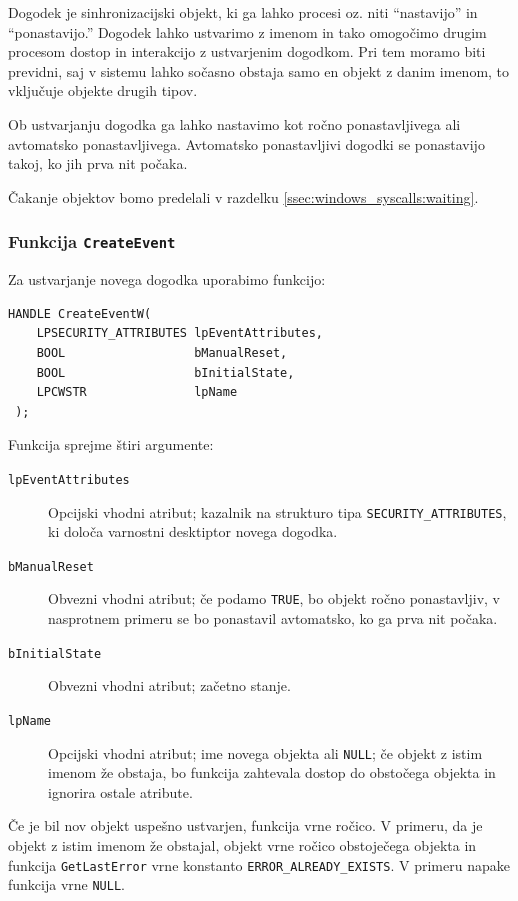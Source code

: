 \documentclass[a4paper,12pt,openright]{book}
\begin{document}
Dogodek je sinhronizacijski objekt, ki ga lahko procesi oz. niti ``nastavijo'' in ``ponastavijo.''
Dogodek lahko ustvarimo z imenom in tako omogočimo drugim procesom dostop in interakcijo z ustvarjenim dogodkom.
Pri tem moramo biti previdni, saj v sistemu lahko sočasno obstaja samo en objekt z danim imenom, to vključuje objekte drugih tipov.

Ob ustvarjanju dogodka ga lahko nastavimo kot ročno ponastavljivega ali avtomatsko ponastavljivega.
Avtomatsko ponastavljivi dogodki se ponastavijo takoj, ko jih prva nit počaka.

Čakanje objektov bomo predelali v razdelku \ref{ssec:windows_syscalls:waiting}.

\subsubsection{Funkcija \texttt{CreateEvent}}

Za ustvarjanje novega dogodka uporabimo funkcijo:
\begin{lstlisting}[style=func]
 HANDLE CreateEventW(
	LPSECURITY_ATTRIBUTES lpEventAttributes,
	BOOL                  bManualReset,
	BOOL                  bInitialState,
	LPCWSTR               lpName
 );
\end{lstlisting}

Funkcija sprejme štiri argumente:
\begin{description}
	\item[\texttt{lpEventAttributes}] Opcijski vhodni atribut; kazalnik na strukturo tipa \texttt{SECURITY\-\_ATTRIBUTES}, ki določa varnostni desktiptor novega dogodka.
	\item[\texttt{bManualReset}] Obvezni vhodni atribut; če podamo \texttt{TRUE}, bo objekt ročno ponastavljiv, v nasprotnem primeru se bo ponastavil avtomatsko, ko ga prva nit počaka.
	\item[\texttt{bInitialState}] Obvezni vhodni atribut; začetno stanje.
	\item[\texttt{lpName}] Opcijski vhodni atribut; ime novega objekta ali \texttt{NULL}; če objekt z istim imenom že obstaja, bo funkcija zahtevala dostop do obstočega objekta in ignorira ostale atribute.
\end{description}

Če je bil nov objekt uspešno ustvarjen, funkcija vrne ročico.
V primeru, da je objekt z istim imenom že obstajal, objekt vrne ročico obstoječega objekta in funkcija \texttt{GetLastError} vrne konstanto \texttt{ERROR\_ALREADY\_EXISTS}.
V primeru napake funkcija vrne \texttt{NULL}.
\end{document}

